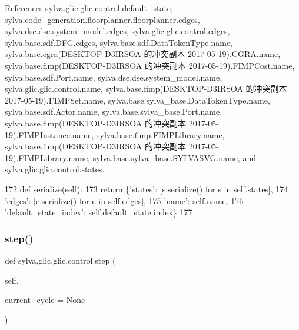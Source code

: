 References sylva.\+glic.\+glic.\+control.\+default\+\_\+state, sylva.\+code\+\_\+generation.\+floorplanner.\+floorplanner.\+edges, sylva.\+dse.\+dse.\+system\+\_\+model.\+edges, sylva.\+glic.\+glic.\+control.\+edges, sylva.\+base.\+sdf.\+D\+F\+G.\+edges, sylva.\+base.\+sdf.\+Data\+Token\+Type.\+name, sylva.\+base.\+cgra(\+D\+E\+S\+K\+T\+O\+P-\/\+D3\+I\+R\+S\+O\+A 的冲突副本 2017-\/05-\/19).\+C\+G\+R\+A.\+name, sylva.\+base.\+fimp(\+D\+E\+S\+K\+T\+O\+P-\/\+D3\+I\+R\+S\+O\+A 的冲突副本 2017-\/05-\/19).\+F\+I\+M\+P\+Cost.\+name, sylva.\+base.\+sdf.\+Port.\+name, sylva.\+dse.\+dse.\+system\+\_\+model.\+name, sylva.\+glic.\+glic.\+control.\+name, sylva.\+base.\+fimp(\+D\+E\+S\+K\+T\+O\+P-\/\+D3\+I\+R\+S\+O\+A 的冲突副本 2017-\/05-\/19).\+F\+I\+M\+P\+Set.\+name, sylva.\+base.\+sylva\+\_\+base.\+Data\+Token\+Type.\+name, sylva.\+base.\+sdf.\+Actor.\+name, sylva.\+base.\+sylva\+\_\+base.\+Port.\+name, sylva.\+base.\+fimp(\+D\+E\+S\+K\+T\+O\+P-\/\+D3\+I\+R\+S\+O\+A 的冲突副本 2017-\/05-\/19).\+F\+I\+M\+P\+Instance.\+name, sylva.\+base.\+fimp.\+F\+I\+M\+P\+Library.\+name, sylva.\+base.\+fimp(\+D\+E\+S\+K\+T\+O\+P-\/\+D3\+I\+R\+S\+O\+A 的冲突副本 2017-\/05-\/19).\+F\+I\+M\+P\+Library.\+name, sylva.\+base.\+sylva\+\_\+base.\+S\+Y\+L\+V\+A\+S\+V\+G.\+name, and sylva.\+glic.\+glic.\+control.\+states.


\begin{DoxyCode}
172         \textcolor{keyword}{def }serialize(self):
173             \textcolor{keywordflow}{return} \{\textcolor{stringliteral}{'states'}: [s.serialize() \textcolor{keywordflow}{for} s \textcolor{keywordflow}{in} self.states],
174                     \textcolor{stringliteral}{'edges'}: [e.serialize() \textcolor{keywordflow}{for} e \textcolor{keywordflow}{in} self.edges],
175                     \textcolor{stringliteral}{'name'}: self.name,
176                     \textcolor{stringliteral}{'default\_state\_index'}: self.default\_state.index\}
177 
\end{DoxyCode}
\mbox{\label{classsylva_1_1glic_1_1glic_1_1control_aea52fc110901323d58833de74918965e}} 
\subsubsection{\texorpdfstring{step()}{step()}}
{\footnotesize\ttfamily def sylva.\+glic.\+glic.\+control.\+step (\begin{DoxyParamCaption}\item[{}]{self,  }\item[{}]{current\+\_\+cycle = {\ttfamily None} }\end{DoxyParamCaption})}



